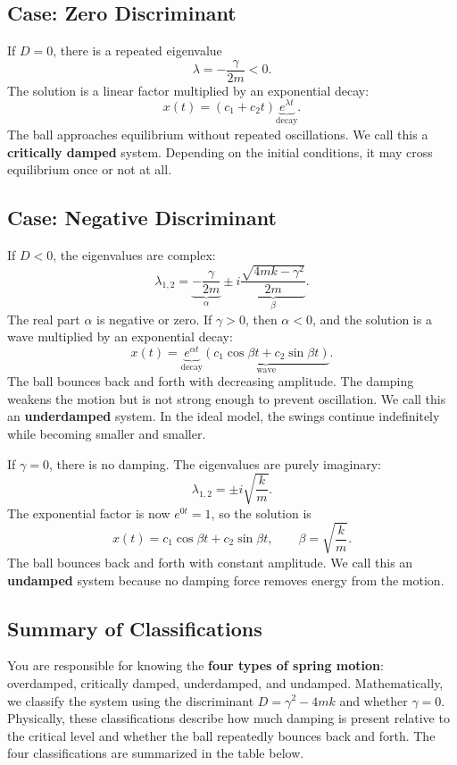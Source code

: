 \documentclass[10pt,letterpaper]{article}
\begin{document}
\subsection{Case: Zero Discriminant}

If $D=0$, there is a repeated eigenvalue
\[
\lambda=-\frac{\gamma}{2m}<0.
\]
The solution is a linear factor multiplied by an exponential decay:
\[
x(t)=(c_1+c_2t)\underbrace{e^{\lambda t}}_{\text{decay}}.
\]
The ball approaches equilibrium without repeated oscillations.
We call this a \textbf{critically damped} system. Depending on the initial conditions, it may cross equilibrium once or not at all. 

\subsection{Case: Negative Discriminant}

If $D<0$, the eigenvalues are complex:
\[
\lambda_{1,2}
=
\underbrace{-\frac{\gamma}{2m}}_{\alpha}
\pm i\underbrace{\frac{\sqrt{4mk-\gamma^2}}{2m}}_{\beta}.
\]
The real part $\alpha$ is negative or zero. If $\gamma>0$, then $\alpha<0$, and the solution is a wave multiplied by an exponential decay:
\[
x(t)=
\underbrace{e^{\alpha t}}_{\text{decay}}
\underbrace{(c_1\cos\beta t+c_2\sin\beta t)}_{\text{wave}}.
\]
The ball bounces back and forth with decreasing amplitude.
The damping weakens the motion but is not strong enough
to prevent oscillation. We call this an
\textbf{underdamped} system. In the ideal model, the swings
continue indefinitely while becoming smaller and smaller.

If $\gamma=0$, there is no damping. The eigenvalues are
purely imaginary:
\[
\lambda_{1,2}=\pm i\sqrt{\frac{k}{m}}.
\]
The exponential factor is now $e^{0t}=1$, so the solution is
\[
x(t)=c_1\cos\beta t+c_2\sin\beta t,
\qquad \beta=\sqrt{\frac{k}{m}}.
\]
The ball bounces back and forth with constant amplitude.
We call this an \textbf{undamped} system because no damping
force removes energy from the motion.

\subsection{Summary of Classifications}
You are responsible for knowing the \textbf{four types of
spring motion}: overdamped, critically damped, underdamped,
and undamped. Mathematically, we classify the system using the discriminant
$D=\gamma^2-4mk$ and whether $\gamma=0$.
Physically, these classifications describe how much damping
is present relative to the critical level and whether the
ball repeatedly bounces back and forth. The four classifications are summarized in the table below. 
\end{document}
